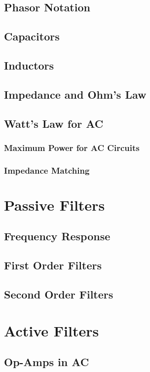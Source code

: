 \documentclass[a4paper,11pt]{book}
\begin{document}
\section{Phasor Notation}
\section{Capacitors}
\section{Inductors}
\section{Impedance and Ohm's Law}
\section{Watt's Law for AC}
\subsection*{Maximum Power for AC Circuits}
\subsection*{Impedance Matching}
\chapter{Passive Filters}
\section{Frequency Response}
\section{First Order Filters}
\section{Second Order Filters}

\chapter{Active Filters}
\section{Op-Amps in AC}
\end{document}
